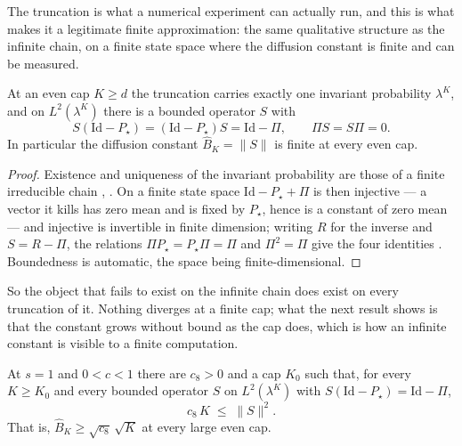 \noindent The truncation is what a numerical experiment can actually run, and this is what makes it a
legitimate finite approximation: the same qualitative structure as the infinite chain, on a
finite state space where the diffusion constant is finite and can be measured.


\begin{theorem}
  \label{thm:main_truncation_bhat}
At an even cap $K\geq d$ the truncation carries exactly one invariant probability $\lambda^K$,
and on $L^2(\lambda^K)$ there is a bounded operator $S$ with
\[ S(\mathrm{Id}-P_\star)=(\mathrm{Id}-P_\star)S=\mathrm{Id}-\Pi,\qquad \Pi S=S\Pi=0 . \]
In particular the diffusion constant $\widehat B_K=\|S\|$ is finite at every even cap.
\end{theorem}

\begin{proof}
Existence and uniqueness of the invariant probability are those of a finite irreducible chain
, . On a finite state space
$\mathrm{Id}-P_\star+\Pi$ is then injective --- a vector it kills has zero mean and is fixed by
$P_\star$, hence is a constant of zero mean --- and injective is invertible in finite
dimension; writing $R$ for the inverse and $S=R-\Pi$, the relations $\Pi P_\star=P_\star\Pi=\Pi$
and $\Pi^2=\Pi$ give the four identities . Boundedness
is automatic, the space being finite-dimensional.
\end{proof}

\noindent So the object that fails to exist on the infinite chain does exist on every truncation of it.
Nothing diverges at a finite cap; what the next result shows is that the constant grows without
bound as the cap does, which is how an infinite constant is visible to a finite computation.


\begin{theorem}
  \label{thm:main_truncation_sqrtK}
At $s=1$ and $0<c<1$ there are $c_8>0$ and a cap $K_0$ such that, for every $K\geq K_0$ and
every bounded operator $S$ on $L^2(\lambda^K)$ with $S(\mathrm{Id}-P_\star)=\mathrm{Id}-\Pi$,
\[ c_8\,K \;\leq\; \|S\|^2 . \]
That is, $\widehat B_K\geq\sqrt{c_8}\,\sqrt K$ at every large even cap.
\end{theorem}

